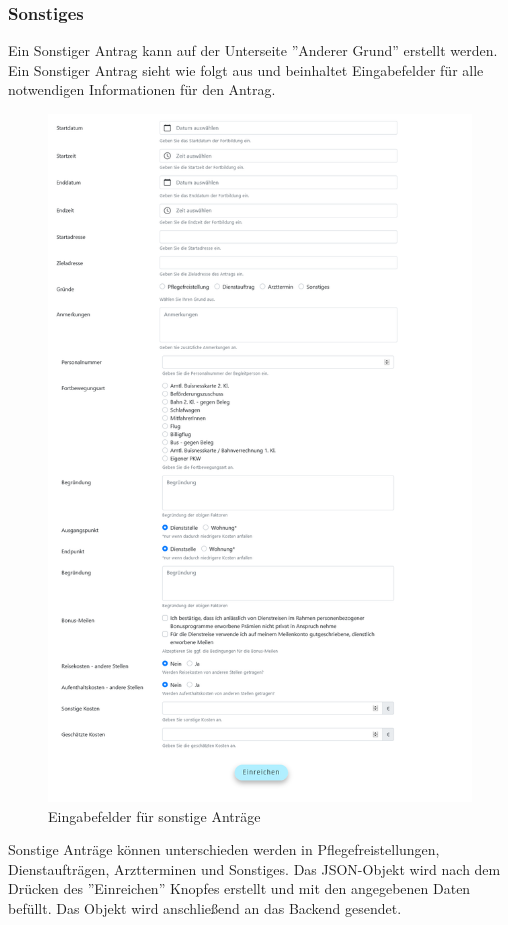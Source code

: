 \subsubsection{Sonstiges}
Ein Sonstiger Antrag kann auf der Unterseite ''Anderer Grund'' erstellt werden. Ein Sonstiger Antrag sieht wie folgt aus und beinhaltet Eingabefelder für alle notwendigen Informationen für den Antrag.
\begin{figure}[H]
	\centering
	\includegraphics[width=0.75\linewidth]{images/othercause}
	\caption[Sonstiger Antrag]{Eingabefelder für sonstige Anträge}
	\label{fig:othercause}
\end{figure}
Sonstige Anträge können unterschieden werden in Pflegefreistellungen, Dienstaufträgen, Arztterminen und Sonstiges. Das JSON-Objekt wird nach dem Drücken des ''Einreichen'' Knopfes erstellt und mit den angegebenen Daten befüllt. Das Objekt wird anschließend an das Backend gesendet.\\

